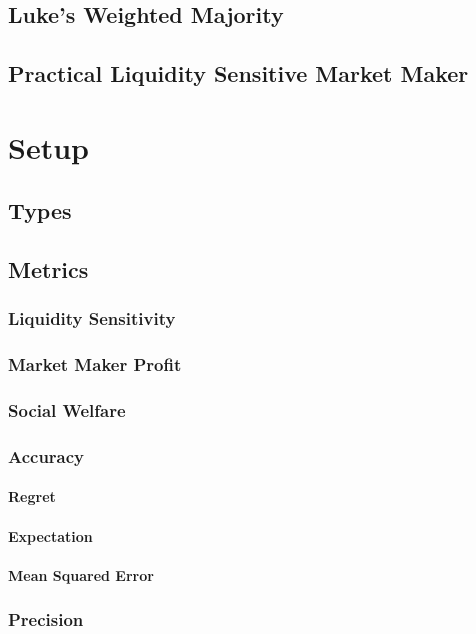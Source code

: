 \subsection{Luke's Weighted Majority}
\subsection{Practical Liquidity Sensitive Market Maker}

\section{Setup}

\subsection{Types}

\subsection{Metrics}
\subsubsection{Liquidity Sensitivity}
\subsubsection{Market Maker Profit}
\subsubsection{Social Welfare}
\subsubsection{Accuracy}
\paragraph{Regret}
\paragraph{Expectation}
\paragraph{Mean Squared Error}
\subsubsection{Precision}